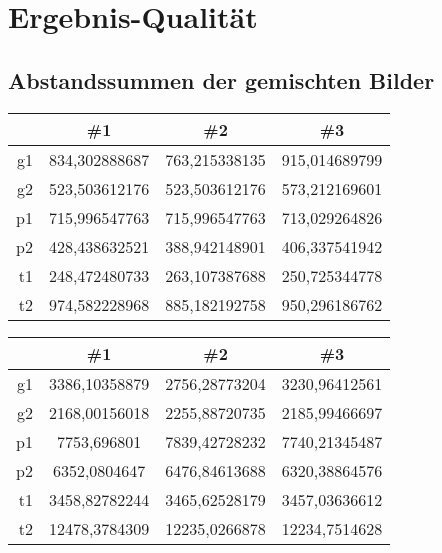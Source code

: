 \section{Ergebnis-Qualität} \label{sec:app_qualität}

\subsection{Abstandssummen der gemischten Bilder} \label{subsec:app_sumShuffle}

\begin{center}
    \begin{tabular}{|r|S[table-format=3.9]|S[table-format=3.9]|S[table-format=3.9]|}
        \hline
         & {\#1} & {\#2} & {\#3} \\\hline
        g1 & 834,302888687 & 763,215338135 & 915,014689799 \\\hline
        g2 & 523,503612176 & 523,503612176 & 573,212169601 \\\hline
        p1 & 715,996547763 & 715,996547763 & 713,029264826 \\\hline
        p2 & 428,438632521 & 388,942148901 & 406,337541942 \\\hline
        t1 & 248,472480733 & 263,107387688 & 250,725344778 \\\hline
        t2 & 974,582228968 & 885,182192758 & 950,296186762 \\\hline
    \end{tabular}
\end{center}
\begin{center}
    \begin{tabular}{|r|S[table-format=5.8]|S[table-format=5.8]|S[table-format=5.8]|}
        \hline
         & {\#1} & {\#2} & {\#3} \\\hline
        g1 & 3386,10358879 & 2756,28773204 & 3230,96412561 \\\hline
        g2 & 2168,00156018 & 2255,88720735 & 2185,99466697 \\\hline
        p1 & 7753,696801   & 7839,42728232 & 7740,21345487 \\\hline
        p2 & 6352,0804647  & 6476,84613688 & 6320,38864576 \\\hline
        t1 & 3458,82782244 & 3465,62528179 & 3457,03636612 \\\hline
        t2 & 12478,3784309 & 12235,0266878 & 12234,7514628 \\\hline
    \end{tabular}
\end{center}

